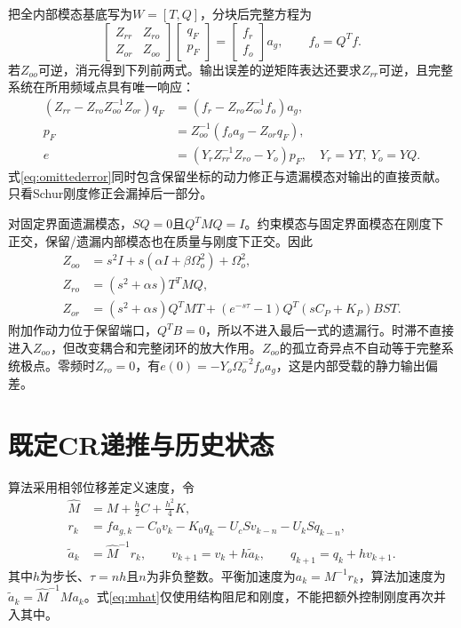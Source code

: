 \documentclass[UTF8,11pt,a4paper]{ctexart}
\begin{document}
把全内部模态基底写为$W=[T,Q]$，分块后完整方程为
\begin{equation}\label{eq:blocks}
 \begin{bmatrix}Z_{rr}&Z_{ro}\\Z_{or}&Z_{oo}\end{bmatrix}
 \begin{bmatrix}q_F\\p_F\end{bmatrix}=
 \begin{bmatrix}f_r\\f_o\end{bmatrix}a_g,
 \qquad f_o=Q^Tf.
\end{equation}
若$Z_{oo}$可逆，消元得到下列前两式。输出误差的逆矩阵表达还要求$Z_{rr}$可逆，且完整系统在所用频域点具有唯一响应：
\begin{align}
 (Z_{rr}-Z_{ro}Z_{oo}^{-1}Z_{or})q_F
   &=(f_r-Z_{ro}Z_{oo}^{-1}f_o)a_g,\label{eq:schur}\\
 p_F&=Z_{oo}^{-1}(f_oa_g-Z_{or}q_F),\label{eq:omitted}\\
 e&=(Y_rZ_{rr}^{-1}Z_{ro}-Y_o)p_F,\quad Y_r=YT,\ Y_o=YQ.\label{eq:omittederror}
\end{align}
式\eqref{eq:omittederror}同时包含保留坐标的动力修正与遗漏模态对输出的直接贡献。只看Schur刚度修正会漏掉后一部分。

对固定界面遗漏模态，$SQ=0$且$Q^TMQ=I$。约束模态与固定界面模态在刚度下正交，保留/遗漏内部模态也在质量与刚度下正交。因此
\begin{align}
 Z_{oo}&=s^2I+s(\alpha I+\beta\Omega_o^2)+\Omega_o^2,\label{eq:zoo}\\
 Z_{ro}&=(s^2+\alpha s)T^TMQ,\label{eq:zro}\\
 Z_{or}&=(s^2+\alpha s)Q^TMT
 +(e^{-s\tau}-1)Q^T(sC_P+K_P)BS T.\label{eq:zor}
\end{align}
附加作动力位于保留端口，$Q^TB=0$，所以不进入最后一式的遗漏行。时滞不直接进入$Z_{oo}$，但改变耦合和完整闭环的放大作用。$Z_{oo}$的孤立奇异点不自动等于完整系统极点。零频时$Z_{ro}=0$，有$e(0)=-Y_o\Omega_o^{-2}f_o a_g$，这是内部受载的静力输出偏差。

\section{既定CR递推与历史状态}
算法采用相邻位移差定义速度，令
\begin{align}
 \widehat M&=M+\tfrac h2 C+\tfrac{h^2}{4}K,\label{eq:mhat}\\
 r_k&=f a_{g,k}-C_0v_k-K_0q_k-U_cSv_{k-n}-U_kSq_{k-n},\label{eq:resforce}\\
 \widetilde a_k&=\widehat M^{-1}r_k,\qquad
 v_{k+1}=v_k+h\widetilde a_k,\qquad q_{k+1}=q_k+h v_{k+1}.\label{eq:cr}
\end{align}
其中$h$为步长、$\tau=nh$且$n$为非负整数。平衡加速度为$a_k=M^{-1}r_k$，算法加速度为$\widetilde a_k=\widehat M^{-1}Ma_k$。式\eqref{eq:mhat}仅使用结构阻尼和刚度，不能把额外控制刚度再次并入其中。
\end{document}
